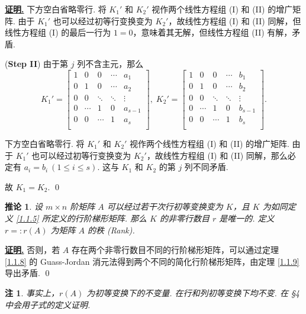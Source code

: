 \documentclass[10pt,openany]{article}
\theoremstyle{thmstyle} %
\theoremstyle{defstyle} %
\newtheorem{corollary}[theorem]{推论}
\theoremstyle{prostyle} %
\newtheorem{remark}[theorem]{注}
\renewenvironment{proof}[1][证明]{\par\underline{\textbf{#1.}} \;\fangsong}{\qed\par}
\begin{document}
\begin{proof}
	下方空白省略零行. 将 \( K_1' \) 和 \( K_2' \) 视作两个线性方程组 (I) 和 (II) 的增广矩阵. 由于 \( K_1' \) 也可以经过初等行变换变为 \( K_2' \)，故线性方程组 (I) 和 (II) 同解，但线性方程组 (I) 的最后一行为 \( 1=0 \)，意味着其无解，但线性方程组 (II) 有解，矛盾.
	
	(\textbf{Step II}) 由于第 \( j \) 列不含主元，那么
	\[ K_1'= \begin{bmatrix}
		1 & 0 & 0  & \cdots & a_1 \\
		0 & 1 & 0   & \cdots & a_2 \\
		0 & 0 & \ddots & \ddots & \vdots  \\
		0 &  \cdots & 1  & 0 & a_{s-1} \\
		0 & 0  & \cdots & 1 & a_s \\
		&  &  &  &   
	\end{bmatrix}, \; K_2'=\begin{bmatrix}
		1 & 0 & 0  & \cdots & b_1 \\
		0 & 1 & 0   & \cdots & b_2 \\
		0 & 0 & \ddots & \ddots & \vdots  \\
		0 &  \cdots & 1  & 0 & b_{s-1} \\
		0 & 0  & \cdots & 1 & b_s \\
		&  &  &  &   
	\end{bmatrix}. \]
	
	下方空白省略零行. 将 \( K_1' \) 和 \( K_2' \) 视作两个线性方程组 (I) 和 (II) 的增广矩阵. 由于 \( K_1' \) 也可以经过初等行变换变为 \( K_2' \)，故线性方程组 (I) 和 (II) 同解，那么必定有 \( a_i=b_i \ (1 \leq i \leq s) \). 这与 \( K_1 \) 和 \( K_2 \) 的第 \( j \) 列不同矛盾.
	
	故 \( K_1=K_2 \).
\end{proof}

\begin{corollary}
	设 \( m \times n \) 阶矩阵 \( A \) 可以经过若干次行初等变换变为 \( K \)，且 \( K \) 为如同定义 \ref{1.1.5} 所定义的行阶梯形矩阵. 那么 \( K \) 的非零行数目 \( r \) 是唯一的. 定义 \( r=:r(A) \) 为矩阵 \( A \) 的秩 (Rank). 
\end{corollary}

\begin{proof}
	否则，若 \( A \) 存在两个非零行数目不同的行阶梯形矩阵，可以通过定理 \ref{1.1.8} 的 Guass-Jordan 消元法得到两个不同的简化行阶梯形矩阵，由定理 \ref{1.1.9} 导出矛盾.
\end{proof}

\begin{remark}
	事实上，\( r(A) \) 为初等变换下的不变量. 在行和列初等变换下均不变. 在 \S 4 中会用子式的定义证明.
\end{remark}
\end{document}
